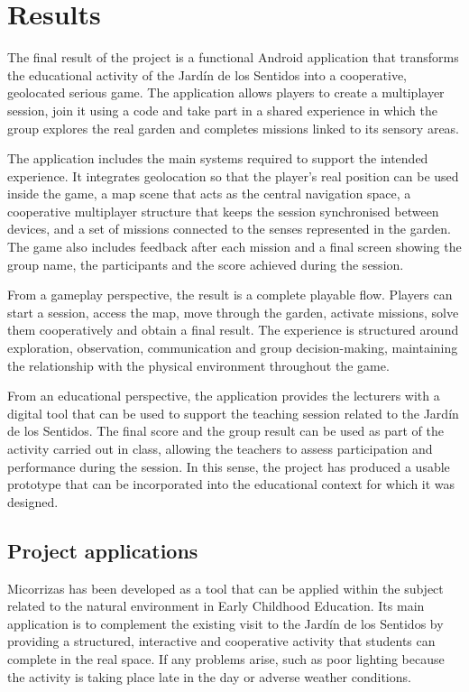 \chapter{Results}
The final result of the project is a functional Android application that transforms the educational activity of the Jardín de los Sentidos into a cooperative, geolocated serious game. The application allows players to create a multiplayer session, join it using a code and take part in a shared experience in which the group explores the real garden and completes missions linked to its sensory areas.

The application includes the main systems required to support the intended experience. It integrates geolocation so that the player’s real position can be used inside the game, a map scene that acts as the central navigation space, a cooperative multiplayer structure that keeps the session synchronised between devices, and a set of missions connected to the senses represented in the garden. The game also includes feedback after each mission and a final screen showing the group name, the participants and the score achieved during the session.

From a gameplay perspective, the result is a complete playable flow. Players can start a session, access the map, move through the garden, activate missions, solve them cooperatively and obtain a final result. The experience is structured around exploration, observation, communication and group decision-making, maintaining the relationship with the physical environment throughout the game.

From an educational perspective, the application provides the lecturers with a digital tool that can be used to support the teaching session related to the Jardín de los Sentidos. The final score and the group result can be used as part of the activity carried out in class, allowing the teachers to assess participation and performance during the session. In this sense, the project has produced a usable prototype that can be incorporated into the educational context for which it was designed.

\section{Project applications}
Micorrizas has been developed as a tool that can be applied within the subject related to the natural environment in Early Childhood Education. Its main application is to complement the existing visit to the Jardín de los Sentidos by providing a structured, interactive and cooperative activity that students can complete in the real space. If any problems arise, such as poor lighting because the activity is taking place late in the day or adverse weather conditions.

